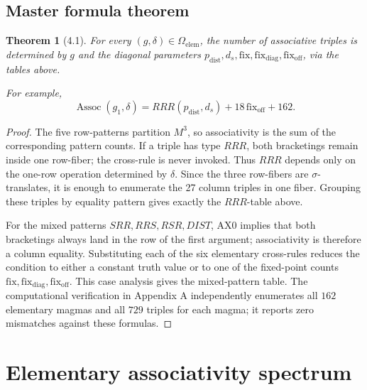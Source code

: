 \documentclass[11pt]{article}
\newtheorem*{theoremstar}{Theorem}
\begin{document}
\subsection{Master formula theorem}

\begin{theoremstar}[4.1]
For every \((g,\delta)\in\Omega_{\mathrm{elem}}\), the number of
associative triples is determined by \(g\) and the diagonal parameters
\(p_{\mathrm{dist}},d_s,\mathrm{fix},\mathrm{fix}_{\mathrm{diag}},\mathrm{fix}_{\mathrm{off}}\), via the tables above.

For example,
\[
\operatorname{Assoc}(g_1,\delta)
=RRR(p_{\mathrm{dist}},d_s)+18\,\mathrm{fix}_{\mathrm{off}}+162.
\]

\end{theoremstar}
\begin{proof}
The five row-patterns partition \(M^3\), so associativity is the sum
of the corresponding pattern counts. If a triple has type \(RRR\), both
bracketings remain inside one row-fiber; the cross-rule is never invoked. Thus
\(RRR\) depends only on the one-row operation determined by \(\delta\). Since the
three row-fibers are \(\sigma\)-translates, it is enough to enumerate the 27
column triples in one fiber. Grouping these triples by equality pattern gives
exactly the \(RRR\)-table above.

For the mixed patterns \(SRR,RRS,RSR,DIST\), AX0 implies that both bracketings
always land in the row of the first argument; associativity is therefore a
column equality. Substituting each of the six elementary cross-rules reduces the
condition to either a constant truth value or to one of the fixed-point counts
\(\mathrm{fix},\mathrm{fix}_{\mathrm{diag}},\mathrm{fix}_{\mathrm{off}}\). This case analysis gives the mixed-pattern
table. The computational verification in Appendix A independently enumerates all
\(162\) elementary magmas and all \(729\) triples for each magma; it reports zero
mismatches against these formulas.

\end{proof}


\section{Elementary associativity spectrum}
\end{document}

